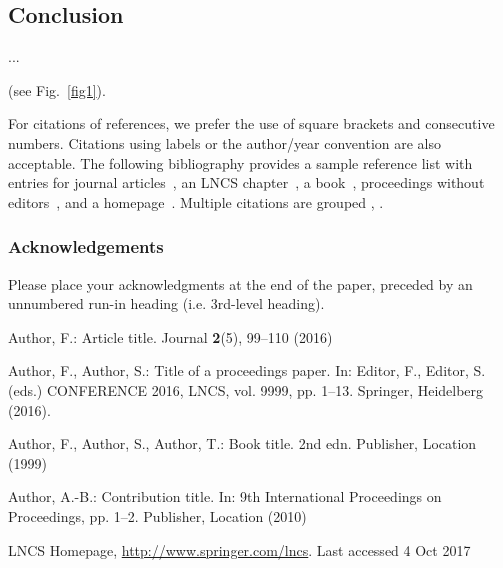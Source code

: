 \documentclass[runningheads]{llncs}
\begin{document}
\subsection{Conclusion}
...

 (see Fig.~\ref{fig1}).

For citations of references, we prefer the use of square brackets
and consecutive numbers. Citations using labels or the author/year
convention are also acceptable. The following bibliography provides
a sample reference list with entries for journal
articles~\cite{ref_article1}, an LNCS chapter~\cite{ref_lncs1}, a
book~\cite{ref_book1}, proceedings without editors~\cite{ref_proc1},
and a homepage~\cite{ref_url1}. Multiple citations are grouped
\cite{ref_article1,ref_lncs1,ref_book1},
\cite{ref_article1,ref_book1,ref_proc1,ref_url1}.

\subsubsection{Acknowledgements} Please place your acknowledgments at
the end of the paper, preceded by an unnumbered run-in heading (i.e.
3rd-level heading).

%
%
%
% 
% 
%
\begin{thebibliography}{8}
Author, F.: Article title. Journal \textbf{2}(5), 99--110 (2016)

Author, F., Author, S.: Title of a proceedings paper. In: Editor,
F., Editor, S. (eds.) CONFERENCE 2016, LNCS, vol. 9999, pp. 1--13.
Springer, Heidelberg (2016). 

Author, F., Author, S., Author, T.: Book title. 2nd edn. Publisher,
Location (1999)

Author, A.-B.: Contribution title. In: 9th International Proceedings
on Proceedings, pp. 1--2. Publisher, Location (2010)

LNCS Homepage, \url{http://www.springer.com/lncs}. Last accessed 4
Oct 2017
\end{thebibliography}
\end{document}
